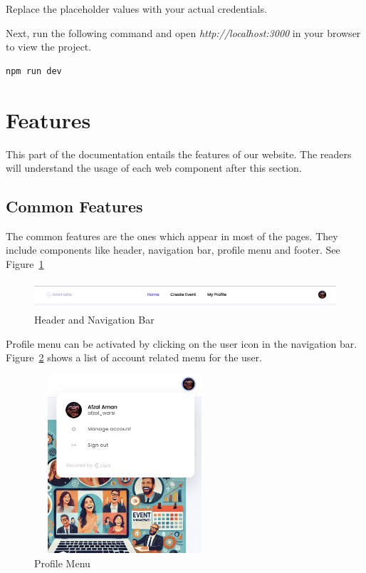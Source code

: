 Replace the placeholder values with your actual credentials.

Next, run the following command and open \textit{http://localhost:3000} in your browser to view the project.
\begin{lstlisting}
npm run dev
\end{lstlisting}


\section{Features}

This part of the documentation entails the features of our website. The readers
will understand the usage of each web component after this section.


\subsection{Common Features}

The common features are the ones which appear in most of the pages. They
include components like header, navigation bar, profile menu and footer. See Figure~\ref{fig:header}

\begin{figure}[H]
	\centering
	\includegraphics[width=1.0\textwidth,height=40px,frame]{images/header.eps}
	\caption{Header and Navigation Bar}
        \label{fig:header}
\end{figure}



Profile menu can be activated by clicking on the user icon in the navigation
bar. Figure~\ref{fig:profile} shows a list of account related menu for the user.

\begin{figure}[H]
	\centering
	\includegraphics[width=0.6\textwidth,height=250px,frame]{images/profile.png}
	\caption{Profile Menu}
        \label{fig:profile}
\end{figure}

